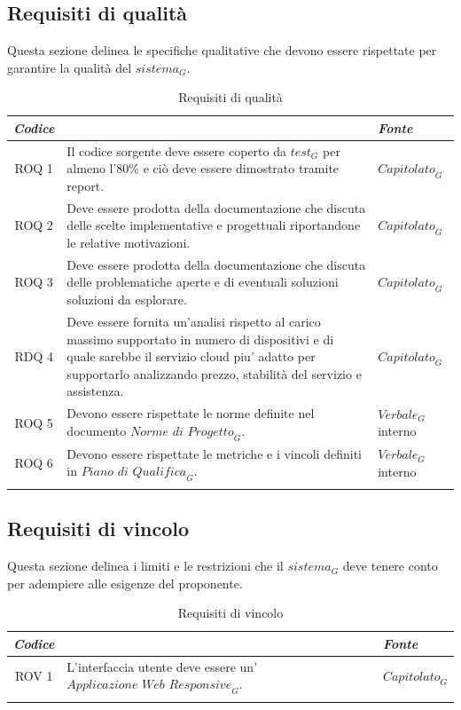 \documentclass[12pt, oneside]{article}
\begin{document}
\subsection{Requisiti di qualità}
Questa sezione delinea le specifiche qualitative che devono essere rispettate per garantire la qualità del $\textit{sistema}_G$.
\begin{longtable}{|c|p{14cm}|p{2cm}|}
    \hline
    \emph{Codice} & \centering{\emph{Descrizione}} &  \emph{Fonte} \\
    \hline
    \endfirsthead
    \endhead
    ROQ 1&  Il codice sorgente deve essere coperto da $\textit{test}_G$ per almeno l'80\% e ciò deve essere dimostrato tramite report. & $\textit{Capitolato}_G$ \\
    \hline
    ROQ 2 & Deve essere prodotta della documentazione che discuta delle scelte implementative e progettuali riportandone le relative motivazioni. & $\textit{Capitolato}_G$ \\
    \hline
    ROQ 3 & Deve essere prodotta della documentazione che discuta delle problematiche aperte e di eventuali soluzioni soluzioni da esplorare. & $\textit{Capitolato}_G$ \\
    \hline
    RDQ 4 & Deve essere fornita un'analisi rispetto al carico massimo supportato in numero di dispositivi e di quale sarebbe il servizio cloud piu' adatto per supportarlo analizzando prezzo, stabilità del servizio e assistenza. & $\textit{Capitolato}_G$ \\
    \hline
    ROQ 5 & Devono essere rispettate le norme definite nel documento $\textit{Norme di Progetto}_G$. & $\textit{Verbale}_G$ interno \\
    \hline
    ROQ 6 & Devono essere rispettate le metriche e i vincoli definiti in $\textit{Piano di Qualifica}_G$. & $\textit{Verbale}_G$ interno \\
    \hline
\caption{Requisiti di qualità}
\end{longtable}
    
\subsection{Requisiti di vincolo}
Questa sezione delinea i limiti e le restrizioni che il $\textit{sistema}_G$ deve tenere conto per adempiere alle esigenze del proponente.
\begin{longtable}{|c|p{14cm}|p{2cm}|}
    \hline
    \emph{Codice} & \centering{\emph{Descrizione}} &  \emph{Fonte} \\
    \hline
    \endfirsthead
    \endhead
    ROV 1& L'interfaccia utente deve essere un'$\textit{Applicazione Web Responsive}_G$.  & $\textit{Capitolato}_G$  \\
    \hline
\caption{Requisiti di vincolo}
\end{longtable}
\end{document}
